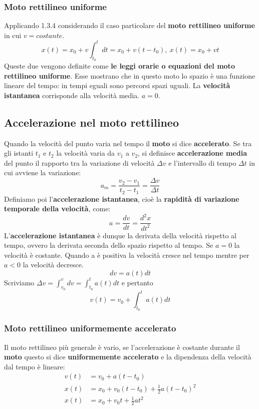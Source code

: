 \documentclass{article}
\numberwithin{equation}{subsection}
\begin{document}
\subsubsection{Moto rettilineo uniforme}
Applicando 1.3.4 considerando il caso particolare del \textbf{moto rettilineo uniforme} in cui $v=costante$.
\begin{equation}
    x(t)= x_0 + v \int_{t_0}^t dt = x_0 + v(t-t_0), \ x(t) = x_0 + vt
\end{equation}
Queste due vengono definite come \textbf{le leggi orarie o equazioni del moto rettilineo uniforme}. Esse mostrano che in questo moto lo spazio è una funzione lineare del tempo: in tempi eguali sono percorsi spazi uguali. La \textbf{velocità istantanea} corrisponde alla velocità media. $a=0$.
\subsection{Accelerazione nel moto rettilineo}
Quando la velocità del punto varia nel tempo il \textbf{moto} si dice \textbf{accelerato}. Se tra gli istanti $t_1$ e $t_2$ la velocità varia da $v_1$ a $v_2$, si definisce \textbf{accelerazione media} del punto il rapporto tra la variazione di velocità $\Delta v$ e l'intervallo di tempo $\Delta t$ in cui avviene la variazione:
\begin{equation}
    a_m = \frac{v_2 - v_1}{t_2 - t_1} = \frac{\Delta v}{\Delta t}
\end{equation}
Definiamo poi l'\textbf{accelerazione istantanea}, cioè la \textbf{rapidità di variazione temporale della velocità}, come:
\begin{equation}
    a=\frac{dv}{dt}=\frac{d^2x}{dt^2}
\end{equation}
L'\textbf{accelerazione istantanea} è dunque la derivata della velocità rispetto al tempo, ovvero la derivata seconda dello spazio rispetto al tempo. Se $a=0$ la velocità è costante. Quando a è positiva la velocità cresce nel tempo mentre per $a<0$ la velocità decresce. 
\begin{equation}
    dv=a(t)dt
\end{equation}
Scriviamo $\Delta v =  \int_{v_0}^v dv=\int_{t_0}^t a(t)dt$ e pertanto
\begin{equation}
    v(t) = v_0 + \int_{t_0}^t a(t)dt
\end{equation}
\subsubsection{Moto rettilineo uniformemente accelerato}
Il moto rettilineo più generale è vario, se l'accelerazione è costante durante il \textbf{moto} questo si dice \textbf{uniformemente accelerato} e la dipendenza della velocità dal tempo è lineare:
\begin{align}
    v(t) &=v_0 + a(t-t_0) \\
    x(t) &= x_0 + v_0(t-t_0)+\frac{1}{2}a(t-t_0)^2 \\
    x(t) &= x_0 + v_0 t + \frac{1}{2}at^2
\end{align}
\newpage
\end{document}
